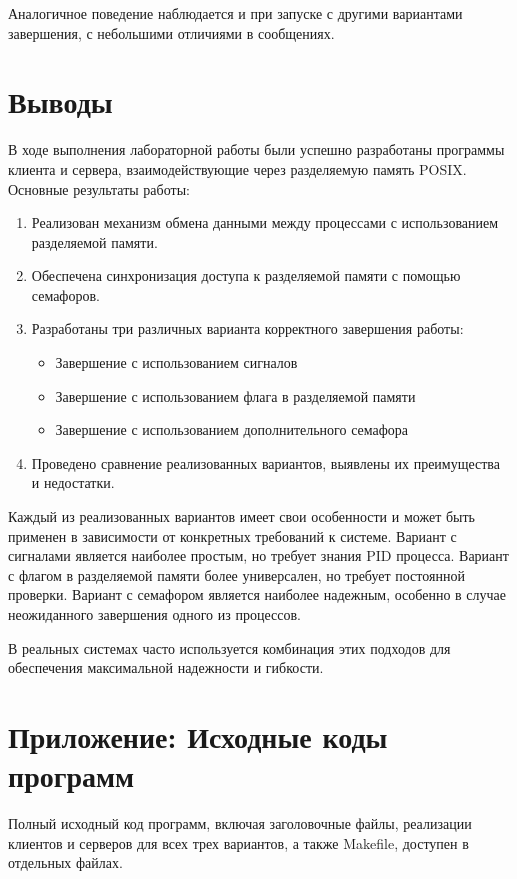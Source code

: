 \documentclass[a4paper,12pt]{article}
\begin{document}
Аналогичное поведение наблюдается и при запуске с другими вариантами завершения, с небольшими отличиями в сообщениях.

\section{Выводы}

В ходе выполнения лабораторной работы были успешно разработаны программы клиента и сервера, взаимодействующие через разделяемую память POSIX. Основные результаты работы:

\begin{enumerate}
    \item Реализован механизм обмена данными между процессами с использованием разделяемой памяти.
    \item Обеспечена синхронизация доступа к разделяемой памяти с помощью семафоров.
    \item Разработаны три различных варианта корректного завершения работы:
    \begin{itemize}
        \item Завершение с использованием сигналов
        \item Завершение с использованием флага в разделяемой памяти
        \item Завершение с использованием дополнительного семафора
    \end{itemize}
    \item Проведено сравнение реализованных вариантов, выявлены их преимущества и недостатки.
\end{enumerate}

Каждый из реализованных вариантов имеет свои особенности и может быть применен в зависимости от конкретных требований к системе. Вариант с сигналами является наиболее простым, но требует знания PID процесса. Вариант с флагом в разделяемой памяти более универсален, но требует постоянной проверки. Вариант с семафором является наиболее надежным, особенно в случае неожиданного завершения одного из процессов.

В реальных системах часто используется комбинация этих подходов для обеспечения максимальной надежности и гибкости.

\section{Приложение: Исходные коды программ}

Полный исходный код программ, включая заголовочные файлы, реализации клиентов и серверов для всех трех вариантов, а также Makefile, доступен в отдельных файлах.
\end{document}
